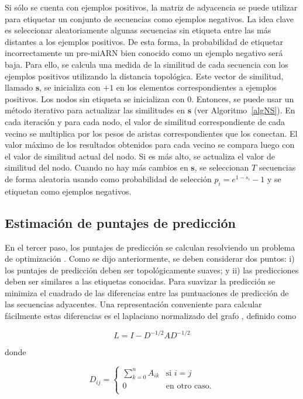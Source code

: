 Si sólo se cuenta con ejemplos positivos, la matriz de adyacencia se puede utilizar para etiquetar un conjunto de secuencias como ejemplos negativos. La idea
clave es seleccionar aleatoriamente algunas secuencias sin etiqueta entre las más distantes a los ejemplos positivos. De esta forma, la probabilidad de
etiquetar incorrectamente un pre-miARN bien conocido como un ejemplo negativo será baja. Para ello, se calcula una medida de la similitud de cada secuencia con
los ejemplos positivos utilizando la distancia topológica. Este vector de similitud, llamado $\mathbf{s}$, se inicializa con $+1$ en los elementos
correspondientes a ejemplos positivos. Los nodos sin etiqueta se inicializan con $0$. Entonces, se puede usar un método iterativo para actualizar las
similitudes en $\mathbf{s}$ (ver Algoritmo~\ref{algNS}). En cada iteración y para cada nodo, el valor de similitud correspondiente de cada vecino se multiplica
por los pesos de aristas correspondientes que los conectan. El valor máximo de los resultados obtenidos para cada vecino se compara luego con el valor de
similitud actual del nodo. Si es más alto, se actualiza el valor de similitud del nodo. Cuando no hay más cambios en $\mathbf{s}$, se seleccionan $T$ secuencias
de forma aleatoria usando como probabilidad de selección $p_{i} = e^{1 - s_{i}} -1$ y se etiquetan como ejemplos negativos.

\subsection{Estimación de puntajes de predicción}

En el tercer paso, los puntajes de predicción se calculan resolviendo un problema de optimización \citep{joachims2003transductive}. Como se dijo anteriormente,
se deben considerar dos puntos: i) los puntajes de predicción deben ser topológicamente suaves; y ii) las predicciones deben ser similares a las etiquetas
conocidas. Para suavizar la predicción se minimiza el cuadrado de las diferencias entre las puntuaciones de predicción de las secuencias adyacentes. Una
representación conveniente para calcular fácilmente estas diferencias es el laplaciano normalizado del grafo \citep{shi2000normalized}, definido
como

\begin{equation*}
	L=I-D^{-1/2}AD^{-1/2}
\end{equation*}

\noindent donde

\begin{equation*}
	D_{ij} =
	\begin{cases}
		\sum_{k=0}^n A_{ik} & \text{si } i=j \\
		0 & \text{en otro caso.} \\
	\end{cases}
\end{equation*}

